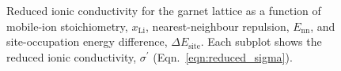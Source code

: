 \documentclass[aps,prb,twocolumn,superscriptaddress,reprint]{revtex4-1}
\newcommand{\xLi}{x_\m{Li}}
\newcommand{\m}[1]{\mathrm{#1}}
\begin{document}
\begin{figure}[tb]
  \centering
    \caption{\label{fig:conductivity_miniplots}Reduced ionic conductivity for the garnet lattice as a function of mobile-ion stoichiometry, $\xLi$, nearest-neighbour repulsion, $E_\m{nn}$, and site-occupation energy difference, $\Delta E_\m{site}$. Each subplot shows the reduced ionic conductivity, $\sigma^\prime$ (Eqn.~\ref{eqn:reduced_sigma}).}
\end{figure}



\end{document}
